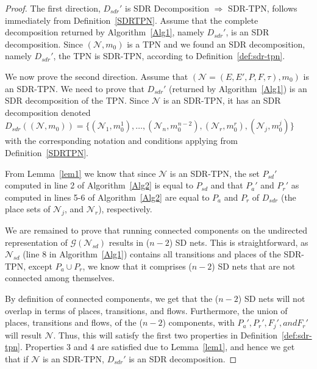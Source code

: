 \documentclass[11pt]{article}
\begin{document}
\begin{proof} The first direction, $D_{sdr}'$ is SDR Decomposition $\Rightarrow$ SDR-TPN, follows immediately from Definition~\ref{SDRTPN}. Assume that the 
	complete decomposition returned by Algorithm~\ref{Alg1}, namely $D_{sdr}'$, 
	is an SDR decomposition. Since $(\mathcal{N},m_0)$ is a 
	TPN and we found an SDR decomposition, 
	namely $D_{sdr}'$, the TPN is SDR-TPN, according to Definition~\ref{def:sdr-tpn}. \\
	
	
	\begin{sloppypar} We now prove the second direction. 
		Assume that $(\mathcal{N} = (E, E', P, F, \tau), m_0)$ is an SDR-TPN.
		We need to prove that $D_{sdr}'$ (returned by Algorithm~\ref{Alg1}) is 
		an SDR decomposition of the TPN. Since $\mathcal{N}$ is an SDR-TPN, 
		it has an SDR decomposition denoted 
		$D_{sdr}((\mathcal{N}, m_0)) = \{(\mathcal{N}_1, m_0^1), \ldots, (\mathcal{N}_n, m_0^{n-2}) , (\mathcal{N}_r, m_0^{r}), (\mathcal{N}_j, m_0^{j})\}$ with the corresponding notation and 
		conditions applying from 
		Definition~\ref{SDRTPN}.  \end{sloppypar}
	
	From Lemma~\ref{lem1} we know that since $\mathcal{N}$ is an SDR-TPN,
	the set $P_{sd}'$ computed in line 2 of Algorithm~\ref{Alg2}
	is equal to $P_{sd}$ and that  
	$P_a'$ and $P_r'$ as computed in lines 5-6 of 
	Algorithm~\ref{Alg2}
	are equal to $P_a$ and $P_r$ of $D_{sdr}$
	(the place sets 
	of $\mathcal{N}_j$, and $\mathcal{N}_r$), 
	respectively.
	
	We are remained to prove that running 
	connected components on the undirected representation of
	$\mathcal{G}(\mathcal{N}_{sd})$ results in ($n-2$)
	SD nets. This is straightforward, as 
	$\mathcal{N}_{sd}$ (line 8 in Algorithm~\ref{Alg1}) 
	contains all transitions and places of 
	the SDR-TPN, except $P_a \cup P_r$, we know that it comprises ($n-2$) SD nets that 
	are not connected among themselves.
	
	By definition of connected components,
	we get that the ($n-2$) SD nets will not overlap 
	in terms of places, transitions, and flows.
	Furthermore, the union of places, transitions and flows, 
	of the ($n-2$) components,
	with $P_a', P_r', F_j', and F_r'$ will result $\mathcal{N}$. Thus, this will satisfy 
	the first two properties in Definition~\ref{def:sdr-tpn}. Properties 3 and 4
	are satisfied due to Lemma~\ref{lem1}, and hence we get that if 
	$\mathcal{N}$ is an SDR-TPN, $D_{sdr}'$ is an SDR decomposition.
\end{proof}
\end{document}
